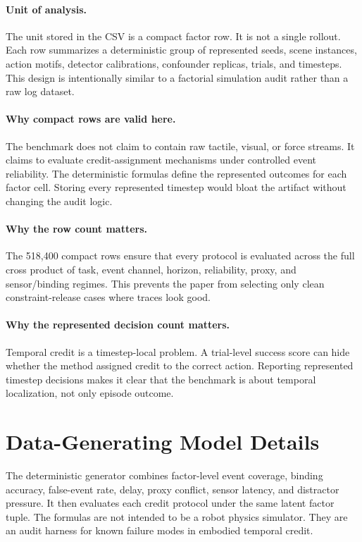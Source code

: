 \documentclass{article}
\begin{document}
\paragraph{Unit of analysis.}
The unit stored in the CSV is a compact factor row. It is not a single rollout. Each row summarizes a deterministic group of represented seeds, scene instances, action motifs, detector calibrations, confounder replicas, trials, and timesteps. This design is intentionally similar to a factorial simulation audit rather than a raw log dataset.

\paragraph{Why compact rows are valid here.}
The benchmark does not claim to contain raw tactile, visual, or force streams. It claims to evaluate credit-assignment mechanisms under controlled event reliability. The deterministic formulas define the represented outcomes for each factor cell. Storing every represented timestep would bloat the artifact without changing the audit logic.

\paragraph{Why the row count matters.}
The 518,400 compact rows ensure that every protocol is evaluated across the full cross product of task, event channel, horizon, reliability, proxy, and sensor/binding regimes. This prevents the paper from selecting only clean constraint-release cases where traces look good.

\paragraph{Why the represented decision count matters.}
Temporal credit is a timestep-local problem. A trial-level success score can hide whether the method assigned credit to the correct action. Reporting represented timestep decisions makes it clear that the benchmark is about temporal localization, not only episode outcome.

\section{Data-Generating Model Details}

The deterministic generator combines factor-level event coverage, binding accuracy, false-event rate, delay, proxy conflict, sensor latency, and distractor pressure. It then evaluates each credit protocol under the same latent factor tuple. The formulas are not intended to be a robot physics simulator. They are an audit harness for known failure modes in embodied temporal credit.
\end{document}

